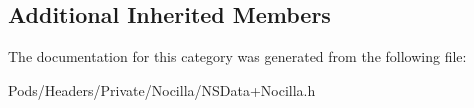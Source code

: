 \subsection*{Additional Inherited Members}


The documentation for this category was generated from the following file\-:\begin{DoxyCompactItemize}
\item 
Pods/\-Headers/\-Private/\-Nocilla/N\-S\-Data+\-Nocilla.\-h\end{DoxyCompactItemize}
